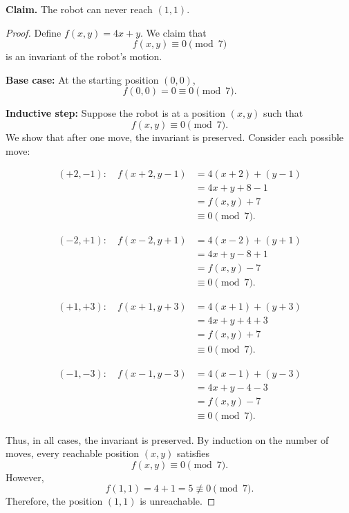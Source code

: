 \documentclass{article}
\begin{document}
\noindent\textbf{Claim.} The robot can never reach $(1,1)$.

\begin{proof}
Define $f(x,y) = 4x + y$. We claim that
\[
f(x,y) \equiv 0 \pmod{7}
\]
is an invariant of the robot's motion.

\medskip\noindent\textbf{Base case:} At the starting position $(0,0)$,
\[
f(0,0) = 0 \equiv 0 \pmod{7}.
\]

\medskip\noindent\textbf{Inductive step:} Suppose the robot is at a position $(x,y)$ such that
\[
f(x,y) \equiv 0 \pmod{7}.
\]
We show that after one move, the invariant is preserved. Consider each possible move:

\begin{align*}
(+2,-1): \quad f(x+2,y-1) &= 4(x+2) + (y-1) \\
&= 4x + y + 8 - 1 \\
&= f(x,y) + 7 \\
&\equiv 0 \pmod{7}.
\end{align*}

\begin{align*}
(-2,+1): \quad f(x-2,y+1) &= 4(x-2) + (y+1) \\
&= 4x + y - 8 + 1 \\
&= f(x,y) - 7 \\
&\equiv 0 \pmod{7}.
\end{align*}

\begin{align*}
(+1,+3): \quad f(x+1,y+3) &= 4(x+1) + (y+3) \\
&= 4x + y + 4 + 3 \\
&= f(x,y) + 7 \\
&\equiv 0 \pmod{7}.
\end{align*}

\begin{align*}
(-1,-3): \quad f(x-1,y-3) &= 4(x-1) + (y-3) \\
&= 4x + y - 4 - 3 \\
&= f(x,y) - 7 \\
&\equiv 0 \pmod{7}.
\end{align*}

\noindent Thus, in all cases, the invariant is preserved. 
By induction on the number of moves, every reachable position $(x,y)$ satisfies
\[
f(x,y) \equiv 0 \pmod{7}.
\]
However,
\[
f(1,1) = 4 + 1 = 5 \not\equiv 0 \pmod{7}.
\]
Therefore, the position $(1,1)$ is unreachable.

\end{proof}
\end{document}
